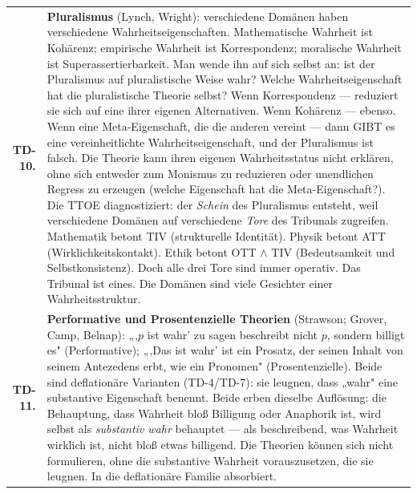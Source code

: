 \documentclass[10pt, openany, oneside]{book}
\renewcommand{\footnotesize}{\fontsize{8.5}{11}\selectfont}
\begin{document}
{\footnotesize
\noindent\begin{tabular}{r p{}}
\textbf{TD-10.} & \textbf{Pluralismus} (Lynch, Wright): verschiedene Domänen haben verschiedene Wahrheitseigenschaften. Mathematische Wahrheit ist Kohärenz; empirische Wahrheit ist Korrespondenz; moralische Wahrheit ist Superassertierbarkeit. Man wende ihn auf sich selbst an: ist der Pluralismus auf pluralistische Weise wahr? Welche Wahrheitseigenschaft hat die pluralistische Theorie selbst? Wenn Korrespondenz --- reduziert sie sich auf eine ihrer eigenen Alternativen. Wenn Kohärenz --- ebenso. Wenn eine Meta-Eigenschaft, die die anderen vereint --- dann GIBT es eine vereinheitlichte Wahrheitseigenschaft, und der Pluralismus ist falsch. Die Theorie kann ihren eigenen Wahrheitsstatus nicht erklären, ohne sich entweder zum Monismus zu reduzieren oder unendlichen Regress zu erzeugen (welche Eigenschaft hat die Meta-Eigenschaft?). Die TTOE diagnostiziert: der \textit{Schein} des Pluralismus entsteht, weil verschiedene Domänen auf verschiedene \textit{Tore} des Tribunals zugreifen. Mathematik betont TIV (strukturelle Identität). Physik betont ATT (Wirklichkeitskontakt). Ethik betont OTT $\wedge$ TIV (Bedeutsamkeit und Selbstkonsistenz). Doch alle drei Tore sind immer operativ. Das Tribunal ist eines. Die Domänen sind viele Gesichter einer Wahrheitsstruktur. \\[0.3em]
\textbf{TD-11.} & \textbf{Performative und Prosentenzielle Theorien} (Strawson; Grover, Camp, Belnap): „‚$p$ ist wahr' zu sagen beschreibt nicht $p$, sondern billigt es" (Performative); „‚Das ist wahr' ist ein Prosatz, der seinen Inhalt von seinem Antezedens erbt, wie ein Pronomen" (Prosentenzielle). Beide sind deflationäre Varianten (TD-4/TD-7): sie leugnen, dass „wahr" eine substantive Eigenschaft benennt. Beide erben dieselbe Auflösung: die Behauptung, dass Wahrheit bloß Billigung oder Anaphorik ist, wird selbst als \textit{substantiv wahr} behauptet --- als beschreibend, was Wahrheit wirklich ist, nicht bloß etwas billigend. Die Theorien können sich nicht formulieren, ohne die substantive Wahrheit vorauszusetzen, die sie leugnen. In die deflationäre Familie absorbiert. \\[0.3em]

\end{tabular}}
\end{document}
